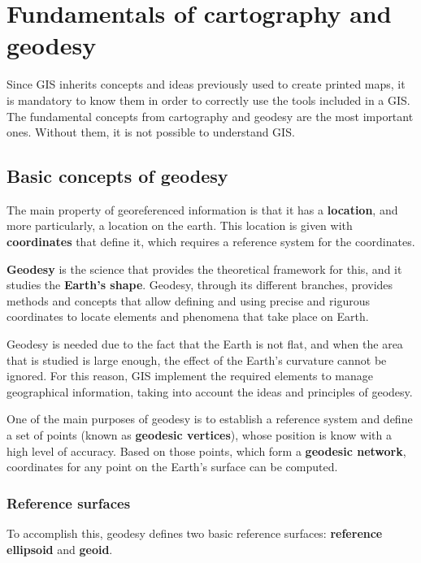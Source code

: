 \label{Fundamentals}
\chapter{Fundamentals of cartography and geodesy}

Since GIS inherits concepts and ideas previously used to create printed maps, it is mandatory to know them in order to correctly use the tools included in a GIS. The fundamental concepts from cartography and geodesy are the most important ones. Without them, it is not possible to understand GIS.


\section{Basic concepts of geodesy}
\pagestyle{fancy}

The main property of georeferenced information is that it has a \textbf{location}, and more particularly, a location on the earth. This location is given with \textbf{coordinates} that define it, which requires a reference system for the coordinates.

\textbf{Geodesy} is the science that provides the theoretical framework for this, and it studies the \textbf{Earth's shape}. Geo\-de\-sy, through its different branches, provides methods and concepts that allow defining and using precise and rigurous coordinates to locate elements and phenomena that take place on Earth.

Geodesy is needed due to the fact that the Earth is not flat, and when the area that is studied is large enough, the effect of the Earth's curvature cannot be ignored. For this reason, GIS implement the required elements to manage geographical information, taking into account the ideas and principles of geodesy.

One of the main purposes of geodesy is to establish a reference system and define a set of points (known as \textbf{geodesic vertices}), whose position is know with a high level of accuracy. Based on those points, which form a \textbf{geodesic network}, coordinates for any point on the Earth's surface can be computed.

\subsection{Reference surfaces}

To accomplish this, geodesy defines two basic reference surfaces: \textbf{reference ellipsoid} and \textbf{geoid}.

